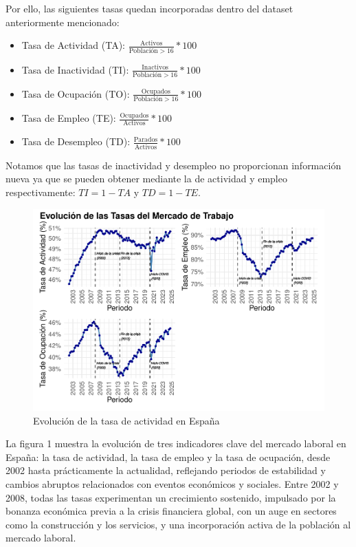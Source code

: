 \documentclass[notspecified,article,submit,moreauthors,pdftex]{Definitions/mdpi}
\begin{document}
Por ello, las siguientes tasas quedan incorporadas dentro del dataset
anteriormente mencionado:

\begin{itemize}
\item
  Tasa de Actividad (TA):
  \(\frac{\text{Activos}}{\text{Población} > 16}*100\)
\item
  Tasa de Inactividad (TI):
  \(\frac{\text{Inactivos}}{\text{Población} > 16}*100\)
\item
  Tasa de Ocupación (TO):
  \(\frac{\text{Ocupados}}{\text{Población} > 16}*100\)
\item
  Tasa de Empleo (TE): \(\frac{\text{Ocupados}}{\text{Activos}}*100\)
\item
  Tasa de Desempleo (TD): \(\frac{\text{Parados}}{\text{Activos}}*100\)
\end{itemize}

Notamos que las tasas de inactividad y desempleo no proporcionan
información nueva ya que se pueden obtener mediante la de actividad y
empleo respectivamente: \(TI = 1 - TA\) y \(TD = 1 - TE\).

\begin{figure}[h]

{\centering \includegraphics[width=1\linewidth]{ProyectoAED2024_files/figure-latex/unnamed-chunk-26-1} 

}

\caption{Evolución de la tasa de actividad en España}\label{fig:unnamed-chunk-26}
\end{figure}

La figura 1 muestra la evolución de tres indicadores clave del mercado
laboral en España: la tasa de actividad, la tasa de empleo y la tasa de
ocupación, desde 2002 hasta prácticamente la actualidad, reflejando
periodos de estabilidad y cambios abruptos relacionados con eventos
económicos y sociales. Entre 2002 y 2008, todas las tasas experimentan
un crecimiento sostenido, impulsado por la bonanza económica previa a la
crisis financiera global, con un auge en sectores como la construcción y
los servicios, y una incorporación activa de la población al mercado
laboral.
\end{document}

